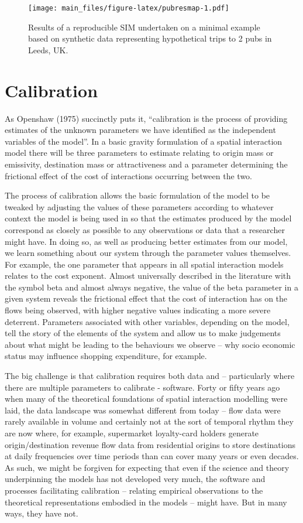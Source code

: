 \documentclass[11pt,letterpaper]{article}
\begin{document}
\begin{figure}
\centering
\texttt{[image: main\_files/figure-latex/pubresmap-1.pdf]}
\caption{\label{fig:pubresmap}Results of a reproducible SIM undertaken on a minimal example based on synthetic data representing hypothetical trips to 2 pubs in Leeds, UK.}
\end{figure}

\hypertarget{calibration}{%
\section{Calibration}\label{calibration}}

As Openshaw (1975) succinctly puts it, ``calibration is the
process of providing estimates of the unknown parameters we have identified as
the independent variables of the model''.
In a basic gravity formulation of a
spatial interaction model there will be three parameters to estimate relating
to origin mass or emissivity, destination mass or attractiveness and a
parameter determining the frictional effect of the cost of interactions
occurring between the two.

The process of calibration allows the basic formulation of
the model to be tweaked by adjusting the values of these parameters according
to whatever context the model is being used in so that the estimates produced by
the model correspond as closely as possible to any observations or data that a
researcher might have.
In doing so, as well as producing better estimates from
our model, we learn something about our system through the parameter values
themselves.
For example, the one parameter that appears in all spatial
interaction models relates to the cost exponent.
Almost universally described in
the literature with the symbol beta and almost always negative, the
value of the beta parameter in a given system reveals the frictional effect
that the cost of interaction has on the flows being observed, with higher
negative values indicating a more severe deterrent.
Parameters associated with other
variables, depending on the model, tell the story of the elements of the system
and allow us to make judgements about what might be leading to the behaviours
we observe -- why socio economic status may influence shopping expenditure, for
example.

The big challenge is that calibration requires both data and
-- particularly where there are multiple parameters to calibrate - software.
Forty
or fifty years ago when many of the theoretical foundations of spatial
interaction modelling were laid, the data landscape was somewhat different from
today -- flow data were rarely available in volume and certainly not at the sort
of temporal rhythm they are now where, for example, supermarket loyalty-card
holders generate origin/destination revenue flow data from residential origins
to store destinations at daily frequencies over time periods than can cover
many years or even decades.
As such, we might be forgiven for expecting that
even if the science and theory underpinning the models has not developed very
much, the software and processes facilitating calibration -- relating empirical observations
to the theoretical representations embodied in the models -- might have.
But in
many ways, they have not.
\end{document}
